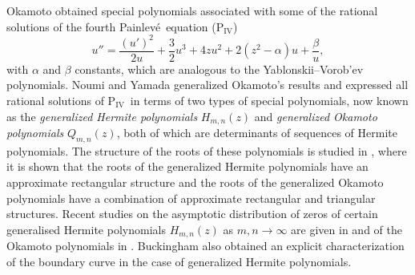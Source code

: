 \documentclass[10pt]{amsart}
\theoremstyle{definition}
\numberwithin{equation}{section}
\numberwithin{figure}{section}
\renewcommand{\PII}{$\mathrm{P}_{\mathrm{II}}$}
\newcommand{\PIV}{$\mathrm{P}_{\mathrm{IV}}$}
\newcommand{\p}{Painlev\'{e}}
\def\d{{\rm d}}
\newcommand{\deriv}[3][]{\frac{\d^{#1}{#2}}{{\d{#3}}^{#1}}}
\renewcommand{\a}{\alpha}
\newcommand{\VY}{Yablonskii--Vorob'ev polynomials}
\begin{document}
Okamoto \cite{okamoto1987studies3} obtained special polynomials associated with some of the rational solutions of the fourth \p\ equation (\PIV) %
\begin{equation}\label{eq:P4}
u''=\frac{(u')^2}{2u} 
+\frac32u^3+4zu^2+2(z^2-\a)u+\frac{\beta}{u},
\end{equation}
with $\a$ and $\beta$ constants, which are analogous to the \VY.
Noumi and Yamada \cite{noumi1999symmetries} generalized Okamoto's results and expressed all rational solutions of \PIV\ in terms of two types of special polynomials, now known as the \textit{generalized Hermite polynomials} $H_{m,n}(z)$ and \textit{generalized Okamoto polynomials} $Q_{m,n}(z)$, both of which are determinants of sequences of Hermite polynomials. The structure of the roots of these polynomials is studied in \cite{clarkson2003fourth}, where it is shown that the roots of the generalized Hermite polynomials have an approximate rectangular structure and the roots of the generalized Okamoto polynomials have a combination of approximate rectangular and triangular structures. 
Recent studies on the asymptotic distribution of zeros of certain generalised Hermite polynomials $H_{m,n}(z)$ as $m,n\to\infty$ are given in
\cite{refBuckPIV,refMR18,masoero2019roots} and of the Okamoto polynomials in \cite{NovokShchel14}.
Buckingham \cite{refBuckPIV} also obtained an explicit characterization of the boundary curve in the case of generalized Hermite polynomials.
\end{document}
